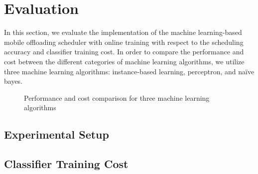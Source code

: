 \documentclass[10pt, conference, compsocconf]{IEEEtran}
\begin{document}
{\section{Evaluation}
%
In this section, we evaluate the implementation of the machine
learning-based mobile offloading scheduler with online training with
respect to the scheduling accuracy and classifier training cost.
%
In order to compare the performance and cost between the different
categories of machine learning algorithms, we utilize three machine
learning algorithms: instance-based learning, perceptron, and na\"{i}ve
bayes.
%
\begin{figure}[ht]
\centering
{}
\caption{Performance and cost comparison for three machine learning
algorithms}
\end{figure}
%
\subsection{Experimental Setup}
%
\subsection{Classifier Training Cost}
%
}
\end{document}
